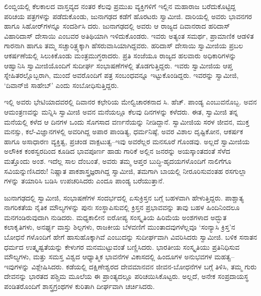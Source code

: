 ಲಿಂಬ್ಡಿಯಲ್ಲಿ ಕೆಲಕಾಲದ ವಾಸ್ತವ್ಯದ ನಂತರ ಕೆಲವು ಪ್ರಮುಖ ವ್ಯಕ್ತಿಗಳಿಗೆ ಇಲ್ಲಿನ ಮಹಾರಾಜ ಬರೆದುಕೊಟ್ಟಿದ್ದ ಪರಿಚಯ ಪತ್ರಗಳನ್ನು ಪಡೆದುಕೊಂಡು, ಜುನಾಗಢದ ಕಡೆಗೆ ಹೊರಟರು ಸ್ವಾಮೀಜಿ. ದಾರಿಯಲ್ಲಿ ಅವರು ಭಾವನಗರ ಹಾಗೂ ಸಿಹೋರ್​ಗಳನ್ನೂ ಸಂದರ್ಶಿಸಿ ದರು. ಜುನಾಗಢದಲ್ಲಿ ಅವರು ಆ ರಾಜ್ಯದ ದಿವಾನರಾದ ಹರಿದಾಸ್ ವಿಹಾರಿದಾಸ್ ದೇಸಾಯಿ ಎಂಬವರ ಅತಿಥಿಯಾಗಿ ಇಳಿದುಕೊಂಡರು. ಇವರು ಅತ್ಯಂತ ಸಮರ್ಥ, ಪ್ರಾಮಾಣಿಕ ಆಡಳಿತ ಗಾರನಾಗಿ ಹಾಗೂ ತಮ್ಮ ಸಚ್ಚಾರಿತ್ರ್ಯಕ್ಕಾಗಿ ಹೆಸರುವಾಸಿಯಾಗಿದ್ದವರು. ಹರಿದಾಸ್ ದೇಸಾಯಿ ಸ್ವಾಮೀಜಿಯ ಪ್ರಬಲ ಆಕರ್ಷಣೆಯಲ್ಲಿ ಸಿಲುಕಿಕೊಂಡು ಮಂತ್ರಮುಗ್ಧರಾದರು. ಪ್ರತಿ ಸಂಜೆಯೂ ರಾಜ್ಯದ ಹಲವಾರು ಅಧಿಕಾರಿಗಳನ್ನು ಆಹ್ವಾನಿಸಿ ಸ್ವಾಮೀಜಿಯೊಂದಿಗೆ ಸುದೀರ್ಘ ಸಂಭಾಷಣೆಗಳಲ್ಲಿ ತೊಡಗುತ್ತಿದ್ದರು. ಇವರು ಸ್ವಾಮೀಜಿಯ ಆಪ್ತ ಸ್ನೇಹಿತರಲ್ಲೊಬ್ಬರಾಗಿ, ಮುಂದೆ ಅವರೊಂದಿಗೆ ಪತ್ರ ಸಂಬಂಧವನ್ನೂ ಇಟ್ಟುಕೊಂಡಿದ್ದರು. ಇವರನ್ನು ಸ್ವಾಮೀಜಿ, ‘ದಿವಾನ್​ಜಿ ಸಾಹೇಬ್​’ ಎಂದು ಸಂಬೋಧಿಸುತ್ತಿದ್ದರು.

ಇಲ್ಲಿ ಅವರು ಭೇಟಿಯಾದವರಲ್ಲಿ ದಿವಾನರ ಕಛೇರಿಯ ಮೇಲ್ವಿಚಾರಕನಾದ ಸಿ. ಹೆಚ್. ಪಾಂಡ್ಯ ಎಂಬುವನೊಬ್ಬ. ಅವನ ಆಮಂತ್ರಣವನ್ನು ಮನ್ನಿಸಿ ಸ್ವಾಮೀಜಿ ಅವನ ಮನೆಯಲ್ಲೂ ಕೆಲವು ದಿನಗಳನ್ನು ಕಳೆದರು. ಈತ, ಸ್ವಾಮೀಜಿ ತನ್ನ ಮನೆಯಲ್ಲಿ ಕಳೆದ ಆ ದಿನಗಳ ಒಂದು ಸೊಗಸಾದ ವರ್ಣನೆಯನ್ನು ನೀಡಿದ್ದಾನೆ. ಸ್ವಾಮೀಜಿಯ ಸರಳ ಜೀವನ, ಮುಕ್ತ ಮನಸ್ಸು, ಕಲೆ-ವಿಜ್ಞಾನಗಳಲ್ಲಿ ಅವರಿಗಿದ್ದ ಅಪಾರ ಪಾಂಡಿತ್ಯ, ಧರ್ಮನಿಷ್ಠೆ, ಅವರ ವಿಶಾಲ ದೃಷ್ಟಿಕೋನ, ಆಕರ್ಷಕ ಹಾಗೂ ಅಸಾಧಾರಣ ವ್ಯಕ್ತಿತ್ವ, ಪ್ರಚಂಡ ವಾಕ್ಪಟುತ್ವ–ಇವು ಅವರೆಲ್ಲರ ಮನಸೂರೆ ಗೊಂಡವು. ಅಲ್ಲದೆ ಸ್ವಾಮೀಜಿಯ ಅಲೌಕಿಕ ಕಂಠಸ್ವರದಿಂದ ಕೂಡಿದ ಭಾವಪೂರ್ಣ ಹಾಡು ಗಾರಿಕೆ ಅಲ್ಲಿನ ಜನರನ್ನು ಅಯಸ್ಕಾಂತದಂತೆ ಸೆಳೆದ ಮತ್ತೊಂದು ಅಂಶ. ಇದೆಲ್ಲ ಸಾಲ ದೆಂಬಂತೆ, ಅವರು ತಮ್ಮ ಆಪ್ತರ ಬುದ್ಧಿ-ಹೃದಯಗಳೊಂದಿಗೆ ನಾಲಿಗೆಗೂ ಸವಿಯನ್ನುಣಿಸಿದರು! ನಿಷ್ಣಾತ ಪಾಕಶಾಸ್ತ್ರಜ್ಞರಾಗಿದ್ದ ಸ್ವಾಮೀಜಿ, ತಮಗಾಗಿ ಬಾಯಲ್ಲಿ ನೀರೂರಿಸುವಂತಹ ರಸಗುಲ್ಲಾ ಗಳನ್ನು ತಯಾರಿಸಿ ಬಡಿಸಿ ಉಪಚರಿಸಿದರು ಎಂದೂ ಪಾಂಡ್ಯ ಬರೆಯುತ್ತಾನೆ.

ಜುನಾಗಢದಲ್ಲಿ ಸ್ವಾಮೀಜಿ, ಸಂಭಾಷಣೆಗಳ ಸಂದರ್ಭದಲ್ಲಿ ಏಸುಕ್ರಿಸ್ತನ ಬಗ್ಗೆ ಬಹಳವಾಗಿ ಹೇಳುತ್ತಿದ್ದರು. ಪಾಶ್ಚಾತ್ಯ ನಾಗರಿಕತೆಯ ನೈತಿಕ ಮೌಲ್ಯಗಳನ್ನು ಪುನಃ ಸಂಸ್ಥಾಪಿಸುವಲ್ಲಿ ಕ್ರಿಸ್ತನ ಪ್ರಭಾವವನ್ನು ತಾವು ಬಹಳ ಹಿಂದಿನಿಂದಲೂ ಮನಗಂಡಿರುವುದಾಗಿ ನುಡಿದರು. ಮಧ್ಯಕಾಲೀನ ಐರೋಪ್ಯ ಸಂಸ್ಕೃತಿಯ ಹಿರಿಮೆಯ ಅಂಶಗಳಾದ ಅದ್ಭುತ ಕಲಾಕೃತಿಗಳು, ಅನರ್ಘ್ಯ ವಾಸ್ತು ಶಿಲ್ಪಗಳು, ರಾಜಕೀಯ ಬೆಳವಣಿಗೆ ಮುಂತಾದವುಗಳೆಲ್ಲವೂ ‘ಸಂನ್ಯಾಸಿ ಕ್ರಿಸ್ತ’ನ ಬೋಧನೆ ಗಳೊಂದಿಗೆ ಹೇಗೆ ಹಾಸುಹೊಕ್ಕಾಗಿವೆ ಎಂಬುದನ್ನು ಸುದೀರ್ಘವಾಗಿ ವಿವರಿಸಿದರು ಸ್ವಾಮೀಜಿ. ಬಳಿಕ ಸನಾತನ ಧರ್ಮದ ಉತ್ಕೃಷ್ಟತೆಯನ್ನು ಕೇಳುಗರ ಮನಮುಟ್ಟುವಂತೆ ಬಣ್ಣಿಸಿದರು. ಭಾರತೀಯ ಸಂಸ್ಕೃತಿಯು ಪ್ರತಿನಿಧಿಸುವ ಮೌಲ್ಯಗಳು, ಮತ್ತು ಸಮಸ್ತ ವಿಶ್ವದ ಆಧ್ಯಾತ್ಮಿಕ ಭಾವನೆಗಳ ವಿಕಾಸದಲ್ಲಿ ಹಿಂದೂಗಳ ಅನುಭವಗಳ ಮಹತ್ವ–ಇವುಗಳನ್ನು ವಿಶ್ಲೇಷಿಸಿದರು. ಕಡೆಯಲ್ಲಿ ದಕ್ಷಿಣೇಶ್ವರದ ದೇವಮಾನವನ ಜೀವನ-ಬೋಧನೆಗಳ ಬಗ್ಗೆ ತಿಳಿಸಿ, ತಮ್ಮ ಗುರು ದೇವನನ್ನು ಭಾರತದ ಪಶ್ಚಿಮ ಮೂಲೆಯ ಈ ಪ್ರಾಂತ್ಯದಲ್ಲೂ ಪರಿಚಯಿಸಿಕೊಟ್ಟರು. ಅಲ್ಲದೆ, ಅನೇಕ ಸಂಪ್ರದಾಯಸ್ಥ ಪಂಡಿತರೊಂದಿಗೆ ಶಾಸ್ತ್ರಗ್ರಂಥಗಳ ಕುರಿತಾಗಿ ದೀರ್ಘವಾಗಿ ಚರ್ಚಿಸಿದರು.

